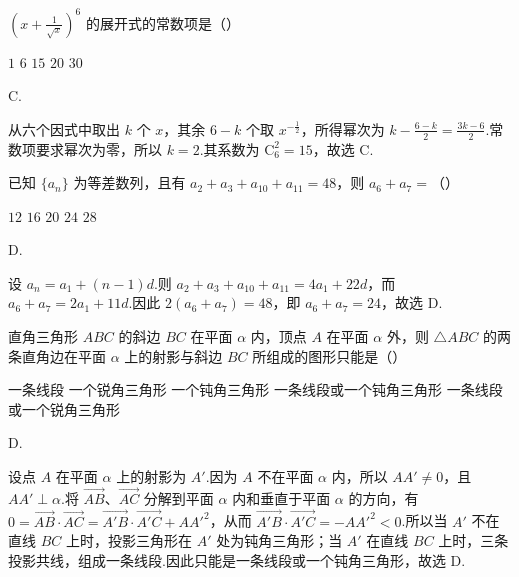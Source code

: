 \begin{problem}

\(\left(x+\frac{1}{\sqrt{x}}\right)^{6} \) 的展开式的常数项是（\quad）

\choicesfive
    {\(1\)}
    {\(6\)}
    {\(15\)}
    {\(20\)}
    {\(30\)}
\end{problem}

\begin{answer}
C.
\end{answer}

\begin{solution}
从六个因式中取出 \(k\) 个 \(x\)，其余 \(6-k\) 个取 \(x^{-\frac{1}{2}}\)，所得幂次为 \(k-\frac{6-k}{2}=\frac{3k-6}{2}\).常数项要求幂次为零，所以 \(k=2\).其系数为 \(\mathrm C_6^2=15\)，故选 C.
\end{solution}

\begin{problem}

已知 \(\{a_{n}\} \) 为等差数列，且有 \(a_{2} + a_{3} + a_{10} + a_{11} = 48 \)，则 \(a_{6} + a_{7} = \)（\quad）

\choicesfive
    {\(12\)}
    {\(16\)}
    {\(20\)}
    {\(24\)}
    {\(28\)}
\end{problem}

\begin{answer}
D.
\end{answer}

\begin{solution}
设 \(a_n=a_1+(n-1)d\).则 \(a_2+a_3+a_{10}+a_{11}=4a_1+22d\)，而 \(a_6+a_7=2a_1+11d\).因此 \(2(a_6+a_7)=48\)，即 \(a_6+a_7=24\)，故选 D.
\end{solution}

\begin{problem}

直角三角形 \(ABC\) 的斜边 \(BC\) 在平面 \(\alpha \) 内，顶点 \(A\) 在平面 \(\alpha \) 外，则 \(\triangle ABC \) 的两条直角边在平面 \(\alpha \) 上的射影与斜边 \(BC\) 所组成的图形只能是（\quad）

\choicesfive
    {一条线段}
    {一个锐角三角形}
    {一个钝角三角形}
    {一条线段或一个钝角三角形}
    {一条线段或一个锐角三角形}
\end{problem}

\begin{answer}
D.
\end{answer}

\begin{solution}
设点 \(A\) 在平面 \(\alpha\) 上的射影为 \(A'\).因为 \(A\) 不在平面 \(\alpha\) 内，所以 \(AA'\ne0\)，且 \(AA'\perp\alpha\).将 \(\overrightarrow{AB}\)、\(\overrightarrow{AC}\) 分解到平面 \(\alpha\) 内和垂直于平面 \(\alpha\) 的方向，有
\(0=\overrightarrow{AB}\cdot\overrightarrow{AC}=\overrightarrow{A'B}\cdot\overrightarrow{A'C}+AA'^{2}\)，从而 \(\overrightarrow{A'B}\cdot\overrightarrow{A'C}=-AA'^{2}<0\).所以当 \(A'\) 不在直线 \(BC\) 上时，投影三角形在 \(A'\) 处为钝角三角形；当 \(A'\) 在直线 \(BC\) 上时，三条投影共线，组成一条线段.因此只能是一条线段或一个钝角三角形，故选 D.
\end{solution}

